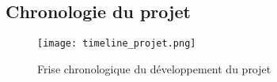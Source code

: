\subsection{Chronologie du projet}
\begin{figure}[hbt!]
    \centering
    \texttt{[image: timeline\_projet.png]}
    \caption{Frise chronologique du développement du projet}

\end{figure}
\FloatBarrier